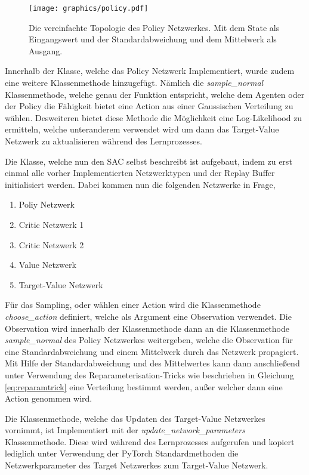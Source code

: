 \documentclass[]{iat}
\begin{document}
\begin{figure}[H]
    \texttt{[image: graphics/policy.pdf]}
    \centering
    \caption{Die vereinfachte Topologie des Policy Netzwerkes. Mit dem State als Eingangswert und der Standardabweichung und dem Mittelwerk als Ausgang.}
    \label{abb:policy_network}
\end{figure}

Innerhalb der Klasse, welche das Policy Netzwerk Implementiert, wurde zudem eine weitere Klassenmethode hinzugefügt. Nämlich die \textit{sample\_normal} Klassenmethode, welche genau der Funktion entspricht, welche dem Agenten oder der Policy die Fähigkeit bietet eine Action aus einer Gaussischen Verteilung zu wählen. Desweiteren bietet diese Methode die Möglichkeit eine Log-Likelihood zu ermitteln, welche unteranderem verwendet wird um dann das Target-Value Netzwerk zu aktualisieren während des Lernprozesses.

Die Klasse, welche nun den SAC selbst beschreibt ist aufgebaut, indem zu erst einmal alle vorher Implementierten Netzwerktypen und der Replay Buffer initialisiert werden. Dabei kommen nun die folgenden Netzwerke in Frage,
\begin{enumerate}
    \item Poliy Netzwerk
    \item Critic Netzwerk 1
    \item Critic Netzwerk 2
    \item Value Netzwerk
    \item Target-Value Netzwerk
\end{enumerate}
Für das Sampling, oder wählen einer Action wird die Klassenmethode \textit{choose\_action} definiert, welche als Argument eine Observation verwendet. Die Observation wird innerhalb der Klassenmethode dann an die Klassenmethode \textit{sample\_normal} des Policy Netzwerkes weitergeben, welche die Observation für eine Standardabweichung und einem Mittelwerk durch das Netzwerk propagiert. Mit Hilfe der Standardabweichung und des Mittelwertes kann dann anschließend unter Verwendung des Reparameterisation-Tricks wie beschrieben in Gleichung \ref{eq:reparamtrick} eine Verteilung bestimmt werden, außer welcher dann eine Action genommen wird.

Die Klassenmethode, welche das Updaten des Target-Value Netzwerkes vornimmt, ist Implementiert mit der \textit{update\_network\_parameters} Klassenmethode. Diese wird während des Lernprozesses aufgerufen und kopiert lediglich unter Verwendung der PyTorch Standardmethoden die Netzwerkparameter des Target Netzwerkes zum Target-Value Netzwerk.
\end{document}

